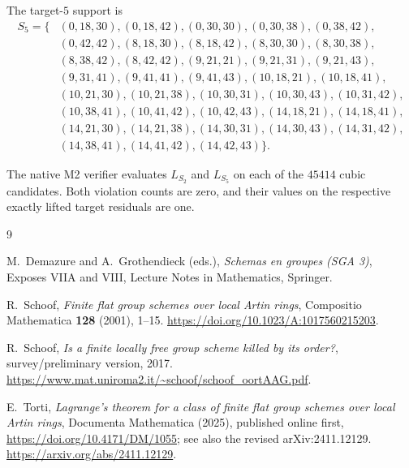 \documentclass[11pt]{article}
\theoremstyle{remark}
\begin{document}
The target-\(5\) support is
\begingroup\small
\begin{align*}
S_5=\{&
(0,18,30),(0,18,42),(0,30,30),(0,30,38),(0,38,42),\\
&(0,42,42),(8,18,30),(8,18,42),(8,30,30),(8,30,38),\\
&(8,38,42),(8,42,42),(9,21,21),(9,21,31),(9,21,43),\\
&(9,31,41),(9,41,41),(9,41,43),(10,18,21),(10,18,41),\\
&(10,21,30),(10,21,38),(10,30,31),(10,30,43),(10,31,42),\\
&(10,38,41),(10,41,42),(10,42,43),(14,18,21),(14,18,41),\\
&(14,21,30),(14,21,38),(14,30,31),(14,30,43),(14,31,42),\\
&(14,38,41),(14,41,42),(14,42,43)\}.
\end{align*}
\endgroup

The native M2 verifier evaluates \(L_{S_2}\) and \(L_{S_5}\) on each of the
\(45414\) cubic candidates.  Both violation counts are zero, and their values
on the respective exactly lifted target residuals are one.

\begin{thebibliography}{9}

M.~Demazure and A.~Grothendieck (eds.),
\emph{Schemas en groupes (SGA 3)},
Exposes VIIA and VIII, Lecture Notes in Mathematics, Springer.

R.~Schoof,
\emph{Finite flat group schemes over local Artin rings},
Compositio Mathematica \textbf{128} (2001), 1--15.
\url{https://doi.org/10.1023/A:1017560215203}.

R.~Schoof,
\emph{Is a finite locally free group scheme killed by its order?},
survey/preliminary version, 2017.
\url{https://www.mat.uniroma2.it/~schoof/schoof_oortAAG.pdf}.

E.~Torti,
\emph{Lagrange's theorem for a class of finite flat group schemes over local
Artin rings},
Documenta Mathematica (2025), published online first,
\url{https://doi.org/10.4171/DM/1055}; see also the revised arXiv:2411.12129.
\url{https://arxiv.org/abs/2411.12129}.

\end{thebibliography}
\end{document}
